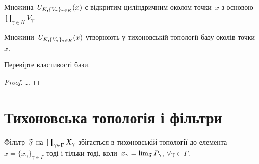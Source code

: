 \begin{remark}
    Множина~$U_{K,\{V_\gamma\}_{\gamma\in K}}(x)$ є відкритим циліндричним околом точки~$x$ з основою~$\prod_{\gamma \in K} V_\gamma$.
\end{remark}

\begin{theorem}
    \label{th:tychonoff-topology-base}
    Множини~$U_{K,\{V_\gamma\}_{\gamma\in K}}(x)$ утворюють у тихоновській топології базу околів точки~$x$.
\end{theorem}

\begin{exercise}
    Перевірте властивості бази.
\end{exercise}

\begin{proof}
    \dots
\end{proof}

\section{Тихоновська топологія і фільтри}

\begin{theorem}
    \label{th:tychonoff-topology-convergence-criterion}
    Фільтр~$\frak F$ на~$\prod_{\gamma\in\Gamma}{X}_\gamma$ збігається в тихоновській топології до елемента~$x = \{x_\gamma\}_{\gamma \in \Gamma}$ тоді і тільки тоді, коли~$x_\gamma = \lim_{\frak F} P_\gamma$, $\forall \gamma \in \Gamma$.
\end{theorem}

